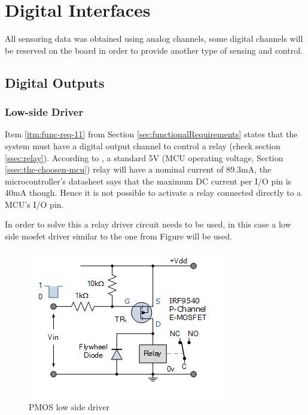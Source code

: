\section{Digital Interfaces}\label{sec:digital-interfaces}

	All sensoring data was obtained using analog channels, some digital channels will be reserved on the board in order to provide another type of sensing and control.

	\subsection{Digital Outputs}\label{ssec:digital-outputs}

		\subsubsection{Low-side Driver}\label{sssec:digital-outputs-low-side-driver}

			Item \ref{itm:func-req-11} from Section \ref{sec:functionalRequirements} states that the system must have a digital output channel to control a relay (check section \ref{ssec:relay}). According to \cite{songle-relay-datasheet}, a standard 5V (MCU operating voltage, Section \ref{ssec:the-choosen-mcu}) relay will have a nominal current of 89.3mA, the microcontroller's datasheet \cite{atmega328p-datasheet} says that the maximum DC current per I/O pin is 40mA though. Hence it is not possible to activate a relay connected directly to a MCU's I/O pin.
			\par 
			In order to solve this a relay driver circuit needs to be used, in this case a low side mosfet driver similar to the one from Figure \cite{pmos-low-side-driver} will be used.

			\begin{figure}[htbp]
				\centering
				\includegraphics[scale=1]{figuras/fig-pmos-low-side-driver.png}
				\caption{PMOS low side driver \cite{pmos-low-side-driver}}
				\label{fig:pmos-low-side-driver}
			\end{figure}

